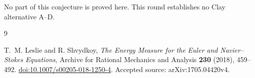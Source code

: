 \documentclass[11pt]{article}
\theoremstyle{remark}
\begin{document}
No part of this conjecture is proved here.  This round establishes no Clay
alternative A--D.

\begin{thebibliography}{9}

T.~M. Leslie and R. Shvydkoy,
\emph{The Energy Measure for the Euler and Navier--Stokes Equations},
Archive for Rational Mechanics and Analysis \textbf{230} (2018),
459--492.
\href{https://doi.org/10.1007/s00205-018-1250-4}
{doi:10.1007/s00205-018-1250-4}.
Accepted source: arXiv:1705.04420v4.

\end{thebibliography}
\end{document}
